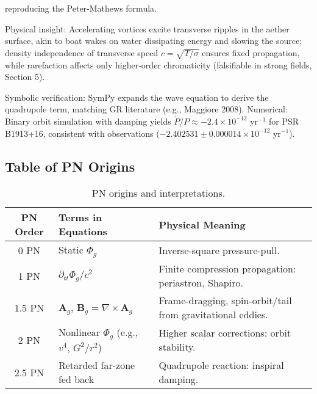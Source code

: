 reproducing the Peter-Mathews formula.

Physical insight: Accelerating vortices excite transverse ripples in the aether surface, akin to boat wakes on water dissipating energy and slowing the source; density independence of transverse speed $c = \sqrt{T / \sigma}$ ensures fixed propagation, while rarefaction affects only higher-order chromaticity (falsifiable in strong fields, Section 5).

Symbolic verification: SymPy expands the wave equation to derive the quadrupole term, matching GR literature (e.g., Maggiore 2008). Numerical: Binary orbit simulation with damping yields $\dot{P}/P \approx -2.4 \times 10^{-12}$ yr$^{-1}$ for PSR B1913+16, consistent with observations ($-2.402531 \pm 0.000014 \times 10^{-12}$ yr$^{-1}$).

\medskip
\noindent
{}
\medskip

\subsection{Table of PN Origins}

\begin{table}[h!]
\centering
\begin{tabular}{|c|l|l|}
\hline
PN Order & Terms in Equations & Physical Meaning \\
\hline
0 PN & Static $\Phi_g$ & Inverse-square pressure-pull. \\
1 PN & $\partial_{tt} \Phi_g / c^2$ & Finite compression propagation: periastron, Shapiro. \\
1.5 PN & $\mathbf{A}_g$, $\mathbf{B}_g = \nabla \times \mathbf{A}_g$ & Frame-dragging, spin-orbit/tail from gravitational eddies. \\
2 PN & Nonlinear $\Phi_g$ (e.g., $v^4$, $G^2 / r^2$) & Higher scalar corrections: orbit stability. \\
2.5 PN & Retarded far-zone fed back & Quadrupole reaction: inspiral damping. \\
\hline
\end{tabular}
\caption{PN origins and interpretations.}
\end{table}

